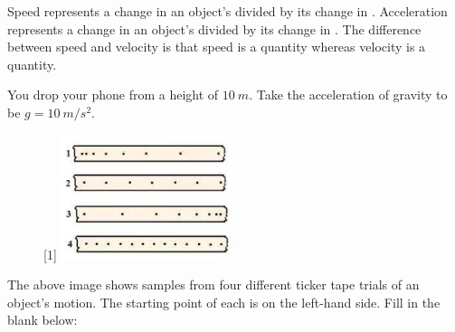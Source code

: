 \begin{questions}
\begin{itemize}
\end{itemize}
\qsp 
{}
\begin{spacing}{1.5}
\question Speed represents a change in an object's \fillin[position][5cm] divided by its change in \fillin[time][5cm]. \qsp
\question Acceleration represents a change in an object's \fillin[speed][5cm] divided by its change in \fillin[time][5cm]. \qsp
\question The difference between speed and velocity is that speed is a \fillin[scalar][5cm] quantity whereas velocity is a \fillin[vector][5cm] quantity. \qsp
\end{spacing}
\newpage
\question You drop your phone from a height of $\SI{10}{m}$. Take the acceleration of gravity to be $g=\SI{10}{m/s^2}$.

\begin{figure}[H]
    \centering
   \scalebox{1}[1]{ \includegraphics[width=0.45\textwidth]{tickertape.jpeg}} %
\end{figure}

\question The above image shows samples from four different ticker tape trials of an object's motion. The starting point of each is on the left-hand side. Fill in the blank below:
\end{questions}
